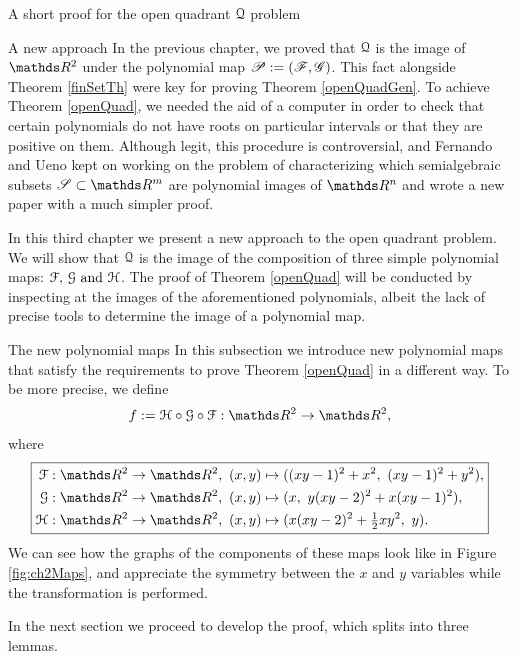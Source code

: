 \documentclass[11pt, a4paper, english, twoside, notitlepage, openright]{report}
\begin{document}
\begin{chapter}{A short proof for the open quadrant $\mathcal{Q}$ problem}
\begin{section}{A new approach}
In the previous chapter, we proved that $\mathcal{Q}$ is the image of $\R^2$ under the polynomial map $\mathscr{P}:=(\mathscr{F},\mathscr{G})$. This fact alongside Theorem \ref{finSetTh} were key for proving Theorem \ref{openQuadGen}. To achieve Theorem \ref{openQuad}, we needed the aid of a computer in order to check that certain polynomials do not have roots on particular intervals or that they are positive on them. Although legit, this procedure is controversial, and Fernando and Ueno kept on working on the problem of characterizing which semialgebraic subsets $\mathscr{S} \subset \R^m$ are polynomial images of $\R^n$ and wrote a new paper \cite{fu} with a much simpler proof.

In this third chapter we present a new approach to the open quadrant problem. We will show that $\mathcal{Q}$ is the image of the composition of three simple polynomial maps: $\mathcal{F},\, \mathcal{G} \text{ and } \mathcal{H}$. The proof of Theorem \ref{openQuad} will be conducted by inspecting at the images of the aforementioned polynomials, albeit the lack of precise tools to determine the image of a polynomial map.

\begin{subsection}{The new polynomial maps}
In this subsection we introduce new polynomial maps that satisfy the requirements to prove Theorem \ref{openQuad} in a different way. To be more precise, we define 
$$
f:=\HH\circ\GG\circ\FF:\R^2\to\R^2,
$$
where
\begin{equation*}\label{eq:secondMap}
\boxed{
\begin{aligned}
\FF:\R^2\to\R^2,\ (x,y)&\mapsto((xy-1)^2+x^2,\ (xy-1)^2+y^2),\\
\GG:\R^2\to\R^2,\ (x,y)&\mapsto(x,\ y(xy-2)^2+x(xy-1)^2),\\
\HH:\R^2\to\R^2,\ (x,y)&\mapsto(x(xy-2)^2+\tfrac{1}{2}xy^2,\ y). \\
\end{aligned}
}
\end{equation*}
We can see how the graphs of the components of these maps look like in Figure \ref{fig:ch2Maps}, and appreciate the symmetry between the $x$ and $y$ variables while the transformation is performed.

\vspace{1mm}

In the next section we proceed to develop the proof, which splits into three lemmas.


\end{subsection}
\end{section}
\end{chapter}
\end{document}
